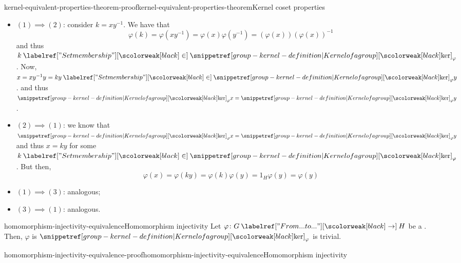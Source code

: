 \documentclass[preview]{standalone}
\begin{document}
\begin{snippetproof}{kernel-equivalent-properties-theorem-proof}{kernel-equivalent-properties-theorem}{Kernel coset properties}
    \begin{itemize}
        \item \((1) \implies (2)\): consider \(k = xy^{-1}\). We have that
        \[\varphi(k) = \varphi(xy^{-1}) = \varphi(x)\varphi(y^{-1}) = (\varphi(x)){(\varphi(x))}^{-1}\]
        and thus \(k \in \grpker_\varphi\). Now, \(x = xy^{-1}y = ky \in \grpker_\varphi y\).
        and thus \(\grpker_\varphi x = \grpker_\varphi y\).
        \item \((2) \implies (1)\): we know that \(\grpker_\varphi x = \grpker_\varphi y\) and thus
        \(x = ky\) for some \(k\in \grpker_\varphi\). But then,
        \[
            \varphi(x) = \varphi(ky) = \varphi(k) \varphi(y) = 1_H \varphi(y) = \varphi(y)
        \]
        \item \((1) \implies (3)\): analogous;
        \item \((3) \implies (1)\): analogous.
    \end{itemize}
\end{snippetproof}

\begin{snippetcorollary}{homomorphism-injectivity-equivalence}{Homomorphism injectivity}
    Let \(\varphi \colon G \fromto H\) be a \grouphomomorphism.
    Then, \(\varphi\) is \injective \ifandonlyif \(\grpker_\varphi\) is trivial.
\end{snippetcorollary}

\begin{snippetproof}{homomorphism-injectivity-equivalence-proof}{homomorphism-injectivity-equivalence}{Homomorphism injectivity}
\end{snippetproof}

\end{document}
